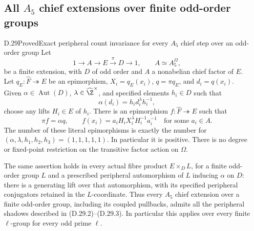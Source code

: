 \subsection{All $A_5$ chief extensions over finite odd-order groups}

\begin{statement}{D.29}{Proved}{Exact peripheral count invariance for every $A_5$ chief step over an odd-order group}
Let
\[
 1\longrightarrow A\longrightarrow E\xrightarrow{\pi}D
 \longrightarrow1,
 \qquad A\simeq A_5^{\Omega},
 \tag{D.29.1}
\]
be a finite extension, with $D$ of odd order and $A$ a
nonabelian chief factor of $E$.  Let
$q_E:\widehat F\twoheadrightarrow E$ be an epimorphism,
$X_i=q_E(x_i)$, $q=\pi q_E$, and $d_i=q(x_i)$.
Given $\alpha\in\operatorname{Aut}(D)$,
$\lambda\in\widehat\Z^\times$, and specified elements
$h_i\in D$ such that
\[
           \alpha(d_i)=h_i d_i^\lambda h_i^{-1},
 \tag{D.29.2}
\]
choose any lifts $H_i\in E$ of $h_i$.
There is an epimorphism $f:\widehat F\twoheadrightarrow E$
such that
\[
 \pi f=\alpha q,
 \qquad
 f(x_i)=a_iH_iX_i^\lambda H_i^{-1}a_i^{-1}
              \quad\text{for some }a_i\in A.
 \tag{D.29.3}
\]
The number of these literal epimorphisms is exactly the
number for $(\alpha,\lambda,h_1,h_2,h_3)=(1,1,1,1,1)$.
In particular it is positive.  There is no degree or
fixed-point restriction on the transitive factor action
on $\Omega$.

The same assertion holds in every actual fibre product
$E\times_D L$, for a finite odd-order group $L$ and a prescribed
peripheral automorphism of $L$ inducing $\alpha$ on $D$:
there is a generating lift over that automorphism, with
its specified peripheral conjugators retained in the
$L$-coordinate.  Thus every $A_5$ chief extension over a
finite odd-order group, including its coupled pullbacks, admits
all the peripheral shadows described in
\textup{(D.29.2)--(D.29.3)}.
In particular this applies over every finite $\ell$-group
for every odd prime $\ell$.
\end{statement}

